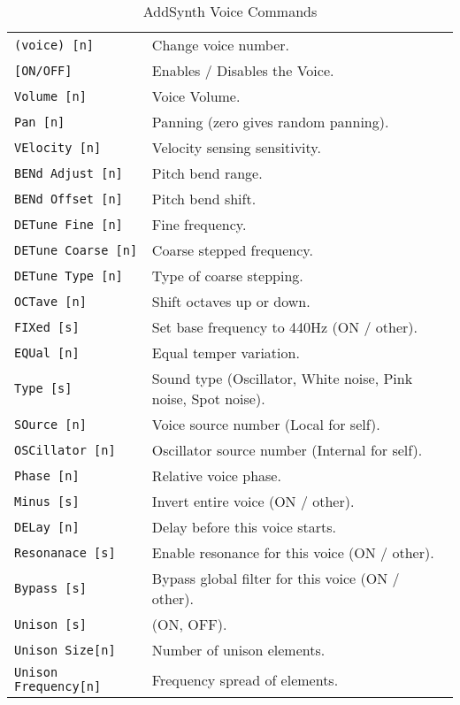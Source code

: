    \begin{table}[H]
      \caption{AddSynth Voice Commands}
      \label{table:yoshimi_part_addsynth_voice_commands}
      \begin{tabular}{l l}
\texttt{(voice) [n]} &
   Change voice number.  \\
\texttt{[ON/OFF]} &
   Enables / Disables the Voice. \\
\texttt{Volume [n]} &
   Voice Volume.  \\
\texttt{Pan [n]} &
   Panning (zero gives random panning).\\
\texttt{VElocity [n]} &
   Velocity sensing sensitivity. \\
\texttt{BENd Adjust [n]} &
   Pitch bend range. \\
\texttt{BENd Offset [n]} &
   Pitch bend shift. \\
\texttt{DETune Fine [n]} &
   Fine frequency.   \\
\texttt{DETune Coarse [n]} &
   Coarse stepped frequency.  \\
\texttt{DETune Type [n]} &
   Type of coarse stepping.   \\
\texttt{OCTave [n]} &
   Shift octaves up or down.  \\
\texttt{FIXed [s]} &
   Set base frequency to 440Hz (ON / other).  \\
\texttt{EQUal [n]} &
   Equal temper variation. \\
\texttt{Type [s]} &
   Sound type (Oscillator, White noise, Pink noise, Spot noise). \\
\texttt{SOurce [n]} &
   Voice source number (Local for self). \\
\texttt{OSCillator [n]} &
   Oscillator source number (Internal for self). \\
\texttt{Phase [n]} &
   Relative voice phase. \\
\texttt{Minus [s]} &
   Invert entire voice (ON / other). \\
\texttt{DELay [n]} &
   Delay before this voice starts. \\
\texttt{Resonanace [s]} &
   Enable resonance for this voice (ON / other). \\
\texttt{Bypass [s]} &
   Bypass global filter for this voice (ON / other). \\
\texttt{Unison [s]} &
   (ON, OFF). \\
\texttt{Unison Size[n]} &
   Number of unison elements. \\
\texttt{Unison Frequency[n]} &
   Frequency spread of elements. \\

\end{tabular}
\end{table}
